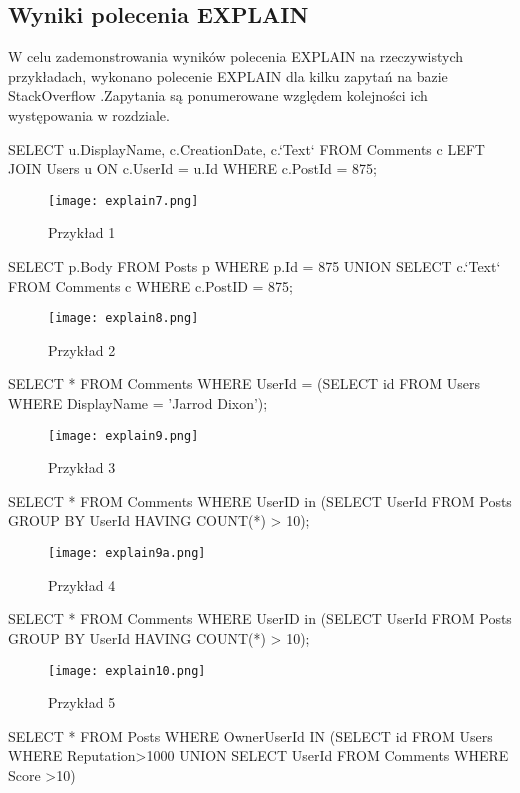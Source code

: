 \subsection{Wyniki polecenia EXPLAIN}
W celu zademonstrowania wyników polecenia EXPLAIN na rzeczywistych przykładach, wykonano polecenie EXPLAIN dla kilku zapytań na bazie StackOverflow .Zapytania są ponumerowane względem kolejności ich występowania w rozdziale.
\begin{spverbatim}
	SELECT u.DisplayName, c.CreationDate, c.`Text` FROM  Comments c LEFT JOIN Users u ON c.UserId = u.Id WHERE c.PostId = 875;
\end{spverbatim}
\begin{figure}[H]
	\texttt{[image: explain7.png]} 
	\caption{Przykład 1}
\end{figure}
\begin{spverbatim}
	SELECT p.Body FROM Posts p WHERE p.Id = 875 UNION
	SELECT c.`Text` FROM Comments c WHERE c.PostID = 875;
\end{spverbatim}
\begin{figure}[H]
	\texttt{[image: explain8.png]} 
	\caption{Przykład 2}
\end{figure}
\begin{spverbatim}
	SELECT * FROM Comments WHERE UserId = (SELECT id FROM Users WHERE DisplayName = 'Jarrod Dixon');
\end{spverbatim}
\begin{figure}[H]
	\texttt{[image: explain9.png]} 
	\caption{Przykład 3}
\end{figure}
\begin{spverbatim}
	SELECT * FROM Comments WHERE UserID in (SELECT UserId FROM Posts GROUP BY UserId HAVING COUNT(*) > 10);
\end{spverbatim}
\begin{figure}[H]
	\texttt{[image: explain9a.png]} 
	\caption{Przykład 4}
\end{figure}
\begin{spverbatim}
	SELECT * FROM Comments WHERE UserID in (SELECT UserId FROM Posts GROUP BY UserId HAVING COUNT(*) > 10);
\end{spverbatim}
\begin{figure}[H]
	\texttt{[image: explain10.png]} 
	\caption{Przykład 5}
\end{figure}
\begin{spverbatim}
	SELECT * FROM Posts  WHERE OwnerUserId IN (SELECT id FROM Users WHERE Reputation>1000 UNION SELECT UserId FROM Comments WHERE Score >10)
\end{spverbatim}
